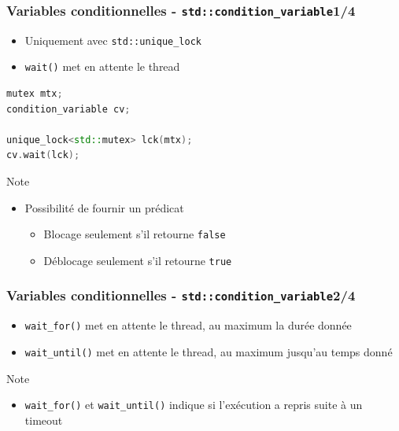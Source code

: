 \documentclass[C++.tex]{subfiles}
\begin{document}
\begin{frame}[fragile]
	\frametitle{Variables conditionnelles - \lstinline|std::condition_variable|\titlehfill{}1/4}
	\begin{itemize}
		\item Uniquement avec \lstinline|std::unique_lock|
		\item \lstinline|wait()| met en attente le thread
	\end{itemize}

	\begin{lstlisting}[language=C++]
mutex mtx;
condition_variable cv;

unique_lock<std::mutex> lck(mtx);
cv.wait(lck);\end{lstlisting}

	\begin{block}{Note}
		\begin{itemize}
			\item Possibilité de fournir un prédicat
			\begin{itemize}
				\item Blocage seulement s'il retourne \lstinline|false|
				\item Déblocage seulement s'il retourne \lstinline|true|
			\end{itemize}
		\end{itemize}
	\end{block}
\end{frame}

\begin{frame}[fragile]
	\frametitle{Variables conditionnelles - \lstinline|std::condition_variable|\titlehfill{}2/4}
	\begin{itemize}
		\item \lstinline|wait_for()| met en attente le thread, au maximum la durée donnée
		\item \lstinline|wait_until()| met en attente le thread, au maximum jusqu'au temps donné
	\end{itemize}

	\begin{block}{Note}
		\begin{itemize}
			\item \lstinline|wait_for()| et \lstinline|wait_until()| indique si l'exécution a repris suite à un timeout
		\end{itemize}
	\end{block}
\end{frame}
\end{document}
